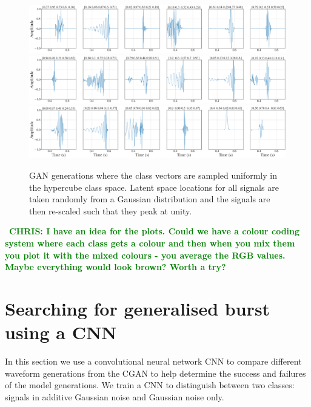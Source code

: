 \documentclass[12pt]{iopart}
\newcommand{\chris}[1]{\textbf{\textcolor{green}{CHRIS: #1}}}
\begin{document}
\begin{figure}
    \centering
    \includegraphics[width=\textwidth]{figures/generations/uniform_sample3.png}
    \includegraphics[width=\textwidth]{figures/generations/uniform_sample2.png}
    \includegraphics[width=\textwidth]{figures/generations/uniform_sample1.png}
    \caption{GAN generations where the class vectors are sampled uniformly in the hypercube class space. Latent space locations for all signals are taken randomly from a Gaussian distribution and the signals are then re-scaled such that they peak at unity.}
    \label{fig:uniform_samples}
\end{figure}

~\chris{I have an idea for the plots. Could we have a colour coding system
where each class gets a colour and then when you mix them you plot it with the
mixed colours - you average the RGB values. Maybe everything would look brown?
Worth a try?}

\section{Searching for generalised burst using a CNN}
In this section  we use a convolutional neural network \ac{CNN} 
to compare different waveform generations from the \ac{CGAN} to help determine the
success and failures of the model generations. We train a \ac{CNN} to distinguish between two classes: signals in additive Gaussian
noise and Gaussian noise only. 
\end{document}
